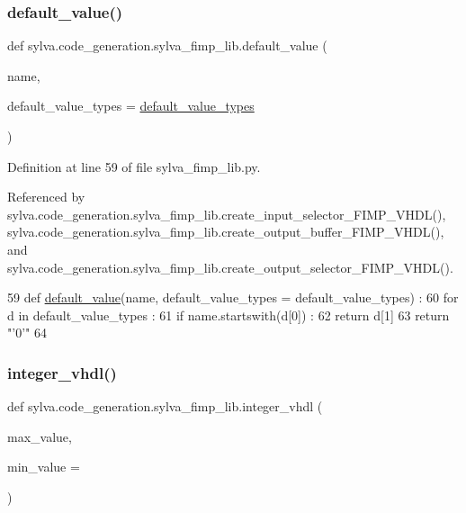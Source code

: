 \subsubsection{\texorpdfstring{default\+\_\+value()}{default\_value()}}
{\footnotesize\ttfamily def sylva.\+code\+\_\+generation.\+sylva\+\_\+fimp\+\_\+lib.\+default\+\_\+value (\begin{DoxyParamCaption}\item[{}]{name,  }\item[{}]{default\+\_\+value\+\_\+types = {\ttfamily \hyperlink{namespacesylva_1_1code__generation_1_1sylva__fimp__lib_aa8422a786f50398770d5f045867640e4}{default\+\_\+value\+\_\+types}} }\end{DoxyParamCaption})}



Definition at line 59 of file sylva\+\_\+fimp\+\_\+lib.\+py.



Referenced by sylva.\+code\+\_\+generation.\+sylva\+\_\+fimp\+\_\+lib.\+create\+\_\+input\+\_\+selector\+\_\+\+F\+I\+M\+P\+\_\+\+V\+H\+D\+L(), sylva.\+code\+\_\+generation.\+sylva\+\_\+fimp\+\_\+lib.\+create\+\_\+output\+\_\+buffer\+\_\+\+F\+I\+M\+P\+\_\+\+V\+H\+D\+L(), and sylva.\+code\+\_\+generation.\+sylva\+\_\+fimp\+\_\+lib.\+create\+\_\+output\+\_\+selector\+\_\+\+F\+I\+M\+P\+\_\+\+V\+H\+D\+L().


\begin{DoxyCode}
59   \textcolor{keyword}{def }\hyperlink{namespacesylva_1_1code__generation_1_1sylva__fimp__lib_a7ade6c6728b5e51bbbbfef039fc718cc}{default\_value}(name, default\_value\_types = default\_value\_types) :
60     \textcolor{keywordflow}{for} d \textcolor{keywordflow}{in} default\_value\_types :
61       \textcolor{keywordflow}{if} name.startswith(d[0]) :
62         \textcolor{keywordflow}{return} d[1]
63     \textcolor{keywordflow}{return} \textcolor{stringliteral}{"'0'"}
64 
\end{DoxyCode}
\mbox{\label{namespacesylva_1_1code__generation_1_1sylva__fimp__lib_acdc15946f5f6a217b6075944dbbd5f59}} 
\subsubsection{\texorpdfstring{integer\+\_\+vhdl()}{integer\_vhdl()}}
{\footnotesize\ttfamily def sylva.\+code\+\_\+generation.\+sylva\+\_\+fimp\+\_\+lib.\+integer\+\_\+vhdl (\begin{DoxyParamCaption}\item[{}]{max\+\_\+value,  }\item[{}]{min\+\_\+value = {} }\end{DoxyParamCaption})}



